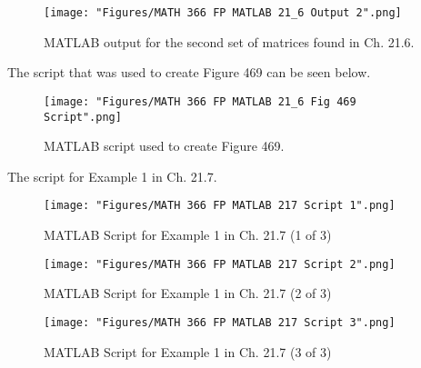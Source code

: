 \begin{figure}[htbp]
\begin{center}
\texttt{[image: "Figures/MATH 366 FP MATLAB 21\_6 Output 2".png]}
\caption*{MATLAB output for the second set of matrices found in Ch. 21.6.}
\end{center}
\end{figure}
\newpage
The script that was used to create Figure 469 can be seen below.
\begin{figure}[htbp]
\begin{center}
\texttt{[image: "Figures/MATH 366 FP MATLAB 21\_6 Fig 469 Script".png]}
\caption*{MATLAB script used to create Figure 469.}
\end{center}
\end{figure}
\newline
\newpage
The script for Example 1 in Ch. 21.7.
\begin{figure}[htbp]
\begin{center}
\texttt{[image: "Figures/MATH 366 FP MATLAB 217 Script 1".png]}
\caption*{MATLAB Script for Example 1 in Ch. 21.7 (1 of 3)}
\end{center}
\end{figure}
\newline
\begin{figure}[htbp]
\begin{center}
\texttt{[image: "Figures/MATH 366 FP MATLAB 217 Script 2".png]}
\caption*{MATLAB Script for Example 1 in Ch. 21.7 (2 of 3)}
\end{center}
\end{figure}
\begin{figure}[htbp]
\begin{center}
\texttt{[image: "Figures/MATH 366 FP MATLAB 217 Script 3".png]}
\caption*{MATLAB Script for Example 1 in Ch. 21.7 (3 of 3)}
\end{center}
\end{figure}
